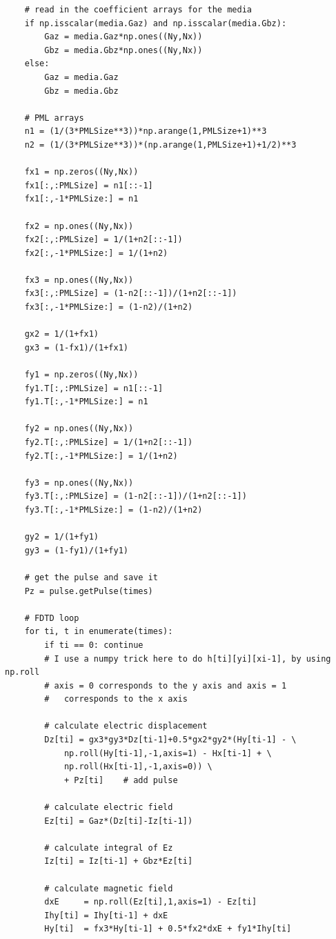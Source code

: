 \documentclass[12pt]{article}
\begin{document}
\begin{verbatim}
    # read in the coefficient arrays for the media
    if np.isscalar(media.Gaz) and np.isscalar(media.Gbz):
        Gaz = media.Gaz*np.ones((Ny,Nx))
        Gbz = media.Gbz*np.ones((Ny,Nx))
    else:
        Gaz = media.Gaz
        Gbz = media.Gbz

    # PML arrays
    n1 = (1/(3*PMLSize**3))*np.arange(1,PMLSize+1)**3
    n2 = (1/(3*PMLSize**3))*(np.arange(1,PMLSize+1)+1/2)**3

    fx1 = np.zeros((Ny,Nx))
    fx1[:,:PMLSize] = n1[::-1]
    fx1[:,-1*PMLSize:] = n1

    fx2 = np.ones((Ny,Nx))
    fx2[:,:PMLSize] = 1/(1+n2[::-1])
    fx2[:,-1*PMLSize:] = 1/(1+n2)

    fx3 = np.ones((Ny,Nx))
    fx3[:,:PMLSize] = (1-n2[::-1])/(1+n2[::-1])
    fx3[:,-1*PMLSize:] = (1-n2)/(1+n2)

    gx2 = 1/(1+fx1)
    gx3 = (1-fx1)/(1+fx1)

    fy1 = np.zeros((Ny,Nx))
    fy1.T[:,:PMLSize] = n1[::-1]
    fy1.T[:,-1*PMLSize:] = n1

    fy2 = np.ones((Ny,Nx))
    fy2.T[:,:PMLSize] = 1/(1+n2[::-1])
    fy2.T[:,-1*PMLSize:] = 1/(1+n2)

    fy3 = np.ones((Ny,Nx))
    fy3.T[:,:PMLSize] = (1-n2[::-1])/(1+n2[::-1])
    fy3.T[:,-1*PMLSize:] = (1-n2)/(1+n2)

    gy2 = 1/(1+fy1)
    gy3 = (1-fy1)/(1+fy1)

    # get the pulse and save it
    Pz = pulse.getPulse(times)

    # FDTD loop
    for ti, t in enumerate(times):
        if ti == 0: continue
        # I use a numpy trick here to do h[ti][yi][xi-1], by using np.roll
        # axis = 0 corresponds to the y axis and axis = 1
        #   corresponds to the x axis

        # calculate electric displacement
        Dz[ti] = gx3*gy3*Dz[ti-1]+0.5*gx2*gy2*(Hy[ti-1] - \
            np.roll(Hy[ti-1],-1,axis=1) - Hx[ti-1] + \
            np.roll(Hx[ti-1],-1,axis=0)) \
            + Pz[ti]    # add pulse

        # calculate electric field
        Ez[ti] = Gaz*(Dz[ti]-Iz[ti-1])

        # calculate integral of Ez
        Iz[ti] = Iz[ti-1] + Gbz*Ez[ti]

        # calculate magnetic field
        dxE     = np.roll(Ez[ti],1,axis=1) - Ez[ti]
        Ihy[ti] = Ihy[ti-1] + dxE
        Hy[ti]  = fx3*Hy[ti-1] + 0.5*fx2*dxE + fy1*Ihy[ti]


\end{verbatim}
\end{document}
